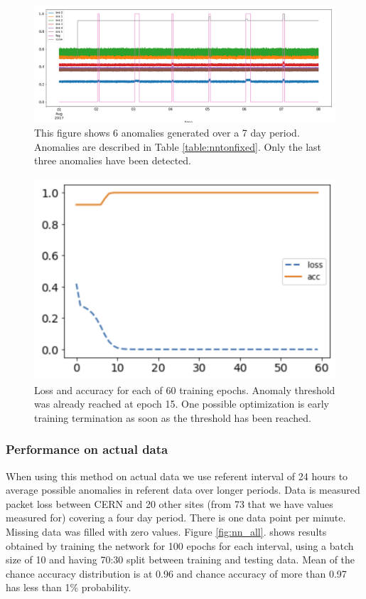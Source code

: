 \documentclass[5p]{elsarticle}
\begin{document}
\begin{figure}[htbp]
    \centering
    \includegraphics[width=1.0\textwidth]{nn_with_auc.png}
    \caption{This figure shows 6 anomalies generated over a 7 day period. Anomalies are described in Table \ref{table:nntonfixed}. Only the last three anomalies have been detected.}
    \label{fig:nnonfixed}
\end{figure}

\begin{figure}[htbp]
    \centering
    \includegraphics[width=\linewidth]{nn_epochs.png}
    \caption{Loss and accuracy for each of 60 training epochs. Anomaly threshold was already reached at epoch 15. One possible optimization is early training termination as soon as the threshold has been reached. }
    \label{fig:loss}
\end{figure}


\subsubsection{Performance on actual data}

When using this method on actual data we use referent interval of 24 hours to average possible anomalies in referent data over longer periods. Data is measured packet loss between CERN and 20 other sites (from 73 that we have values measured for) covering a four day period. There is one data point per minute. Missing data was filled with zero values. Figure \ref{fig:nn_all}. shows results obtained by training the network for 100 epochs for each interval, using a batch size of 10 and having 70:30 split between training and testing data. Mean of the chance accuracy distribution is at 0.96 and chance accuracy of more than 0.97 has less than 1\% probability. 
\end{document}
